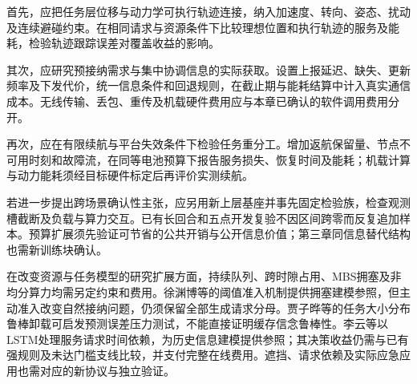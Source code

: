 首先，应把任务层位移与动力学可执行轨迹连接，纳入加速度、转向、姿态、扰动及连续避碰约束。在相同请求与资源条件下比较理想位置和执行轨迹的服务及能耗，检验轨迹跟踪误差对覆盖收益的影响。

其次，应研究预接纳需求与集中协调信息的实际获取。设置上报延迟、缺失、更新频率及下发代价，统一信息条件和回退规则，在截止期与能耗结算中计入真实通信成本。无线传输、丢包、重传及机载硬件费用应与本章已确认的软件调用费用分开。

再次，应在有限续航与平台失效条件下检验任务重分工。增加返航保留量、节点不可用时刻和故障流，在同等电池预算下报告服务损失、恢复时间及能耗；机载计算与动力能耗须经目标硬件标定后再评价实测续航。

若进一步提出跨场景确认性主张，应另用新上层基座并事先固定检验族，检查观测槽截断及负载与算力交互。已有长回合和五点开发复验不因区间跨零而反复追加样本。预算扩展须先验证可节省的公共开销与公开信息价值；第三章同信息替代结构也需新训练块确认。

在改变资源与任务模型的研究扩展方面，持续队列、跨时隙占用、MBS拥塞及非均分算力均需另定约束和费用。徐渊博等的阈值准入机制\cite{xu2025admission}提供拥塞建模参照，但主动准入改变自然接纳问题，仍须保留全部生成请求分母。贾子晔等的任务大小分布鲁棒卸载\cite{jia2025robust}可启发预测误差压力测试，不能直接证明缓存信念鲁棒性。李云等以LSTM处理服务请求时间依赖\cite{li2023arrangement}，为历史信息建模提供参照；其决策收益仍需与已有强规则及未达门槛支线比较，并支付完整在线费用。遮挡、请求依赖及实际应急应用也需对应的新协议与独立验证。

